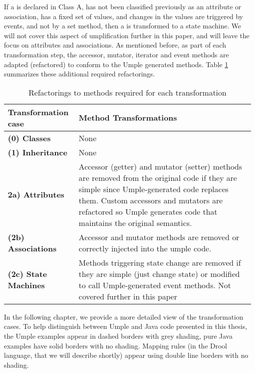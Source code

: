 \begin{description}
\begin{description}
If a is declared in Class A, has not been classified previously as an attribute or association, has a fixed set of values, and changes in the values are triggered by events, and not by a set method, then a is transformed to a state machine.	We will not cover this aspect of umplification further in this paper, and will leave the focus on attributes and associations.
As mentioned before, as part of each transformation step, the accessor, mutator, iterator and event methods are adapted (refactored) to conform to the Umple generated methods. Table \ref{table:trasnformations} summarizes these additional required refactorings. 
   \end{description}

\end{description}

\begin{table}[htbp]
	\caption{Refactorings to methods required for each transformation}
	\label{table:trasnformations}
    \centering
    \begin{tabularx}{\textwidth}{| X | X |}
        \toprule
        \rowcolor[HTML]{BBDAFF}
       \textbf{ Transformation case  }   & \textbf{Method Transformations}
        \\ \hline
        \textbf{(0)  Classes }        & None      \\ \hline
        \textbf{(1)  Inheritance}     & None       \\ \hline
        \textbf{2a)  Attributes}      & 
        Accessor (getter) and mutator (setter) methods are removed from the original code 				if they are simple since Umple-generated code replaces them. Custom accessors and 				mutators are refactored so Umple generates code that maintains the original
        semantics.         		\\ \hline
        \textbf{(2b) Associations }   & 
 		Accessor and mutator methods are removed or correctly injected into the umple code.        
		\\ \hline
        \textbf{(2c) State Machines  }  & 
		Methods triggering state change are removed if they are simple (just change state) or 		modified to call Umple-generated event methods. Not covered further in this 					paper       		
\\ \hline
    \end{tabularx}
\end{table}

In the following chapter, we provide a more detailed view of the transformation cases. To help distinguish between Umple and Java code presented in this thesis, the Umple examples appear in dashed borders with grey shading, pure Java examples have solid borders with no shading. Mapping rules (in the Drool language, that we will describe shortly) appear using double line borders with no shading. 